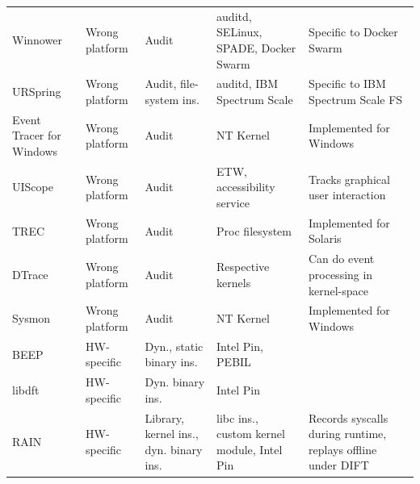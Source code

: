 \begin{table}
{\begin{tabular}{p{}p{}p{}p{}p{}}
Winnower \cite{hassan_towards_2018}                     & Wrong platform   & Audit                                   & auditd, SELinux, SPADE, Docker Swarm          & Specific to Docker Swarm                                      \\
URSpring                                                & Wrong platform   & Audit, file-system ins.                 & auditd, IBM Spectrum Scale                    & Specific to IBM Spectrum Scale FS                             \\
Event Tracer for Windows \cite{noauthor_event_2021}     & Wrong platform   & Audit                                   & NT Kernel                                     & Implemented for Windows                                       \\
UIScope \cite{yang_uiscope_2020}                        & Wrong platform   & Audit                                   & ETW, accessibility service                    & Tracks graphical user interaction                             \\
TREC \cite{vahdat_transparent_1998}                     & Wrong platform   & Audit                                   & Proc filesystem                               & Implemented for Solaris                                       \\
DTrace \cite{noauthor_about_nodate}                     & Wrong platform   & Audit                                   & Respective kernels                            & Can do event processing in kernel-space                       \\
Sysmon \cite{markruss_sysmon_2023}                      & Wrong platform   & Audit                                   & NT Kernel                                     & Implemented for Windows                                       \\
BEEP \cite{lee_high_2017}                               & HW-specific      & Dyn., static binary ins.                & Intel Pin, PEBIL                              &                                                               \\
libdft \cite{kemerlis_libdft_2012}                      & HW-specific      & Dyn. binary ins.                        & Intel Pin                                     &                                                               \\
RAIN \cite{ji_rain_2017}                                & HW-specific      & Library, kernel ins., dyn. binary ins.  & libc ins., custom kernel module, Intel Pin    & Records syscalls during runtime, replays offline under DIFT   \\

\end{tabular}}
\end{table}
